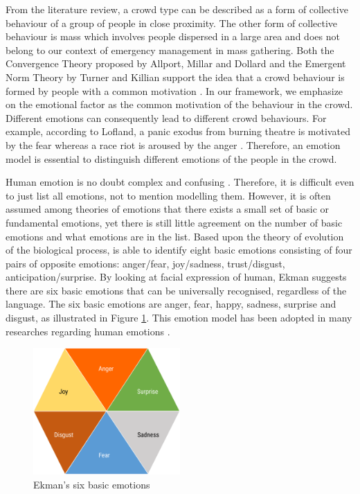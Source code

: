 From the literature review, a crowd type can be described as a form of collective behaviour of a group of people in close proximity. The other form of collective behaviour is mass which involves people dispersed in a large area and does not belong to our context of emergency management in mass gathering. Both the Convergence Theory proposed by Allport, Millar and Dollard and the Emergent Norm Theory by Turner and Killian support the idea that a crowd behaviour is formed by people with a common motivation \citep{mcphail1991myth}. In our framework, we emphasize on the emotional factor as the common motivation of the behaviour in the crowd. Different emotions can consequently lead to different crowd behaviours. For example, according to Lofland, a panic exodus from burning theatre is motivated by the fear whereas a race riot is aroused by the anger \citep{Kornblum2011}. Therefore, an emotion model is essential to distinguish different emotions of the people in the crowd.

Human emotion is no doubt complex and confusing \citet{plutchik2001nature}. Therefore, it is difficult even to just list all emotions, not to mention modelling them. However, it is often assumed among theories of emotions that there exists a small set of basic or fundamental emotions, yet there is still little agreement on the number of basic emotions and what emotions are in the list. Based upon the theory of evolution of the biological process, \citet{plutchik2001integration} is able to identify eight basic emotions consisting of four pairs of opposite emotions: anger/fear, joy/sadness, trust/disgust, anticipation/surprise. By looking at facial expression of human, Ekman suggests there are six basic emotions that can be universally recognised, regardless of the language. The six basic emotions are anger, fear, happy, sadness, surprise and disgust, as illustrated in Figure \ref{fig:emotionModel}. This emotion model has been adopted in many researches regarding human emotions \citep{mohammad2014using, roberts2012empatweet,alm2005emotions}. 

\begin{figure}[htb!]
\centering    
\includegraphics[width=0.5\textwidth]{EkmanModel}
\caption{Ekman's six basic emotions}
\label{fig:emotionModel}
\end{figure}

